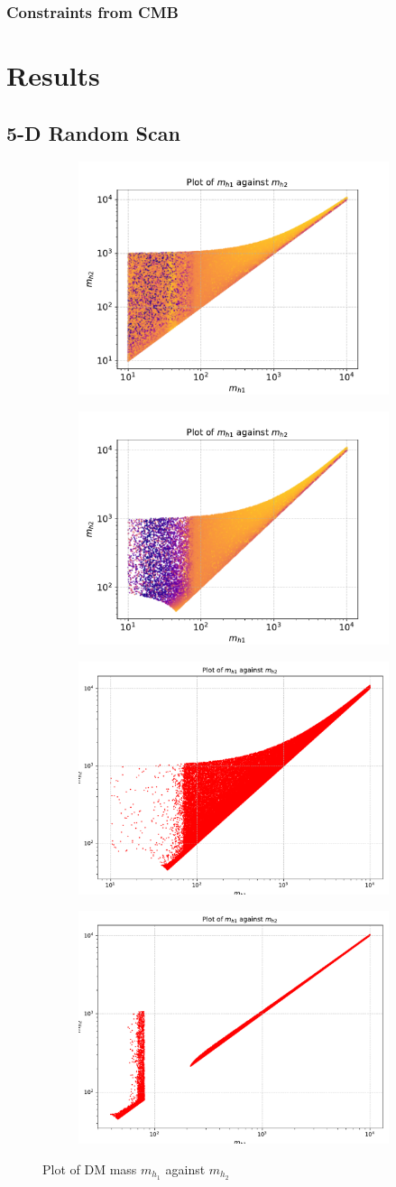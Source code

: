 \documentclass[12pt]{article}
\begin{document}
\subsubsection{Constraints from CMB}

\section{Results}
\label{sec:results}
\subsection{5-D Random Scan}
\label{5-D scan}
\newpage
\onecolumn
\begin{figure}[H]
\begin{subfigure}{\textwidth}
  \centering
  \includegraphics[width=0.2\columnwidth]{plots1/MD1_MD2_cut1.pdf}
\end{subfigure}%
\begin{subfigure}{\textwidth}
  \centering
  \includegraphics[width=0.2\columnwidth]{plots/MD1_MD2_cut1cut2.pdf}
\end{subfigure}
\begin{subfigure}{\textwidth}
  \centering
  \includegraphics[width=0.2\columnwidth]{plots1/MD1_MD2_cut1cut2cut3.pdf}
\end{subfigure}
\begin{subfigure}{\textwidth}
  \centering
  \includegraphics[width=0.2\columnwidth]{plots1/MD1_MD2_cut1cut2cut3cut4.pdf}
\end{subfigure}
\caption{Plot of DM mass $m_{h_1}$ against $m_{h_2}$}
\label{fig:input noise}
\end{figure}
\end{document}

